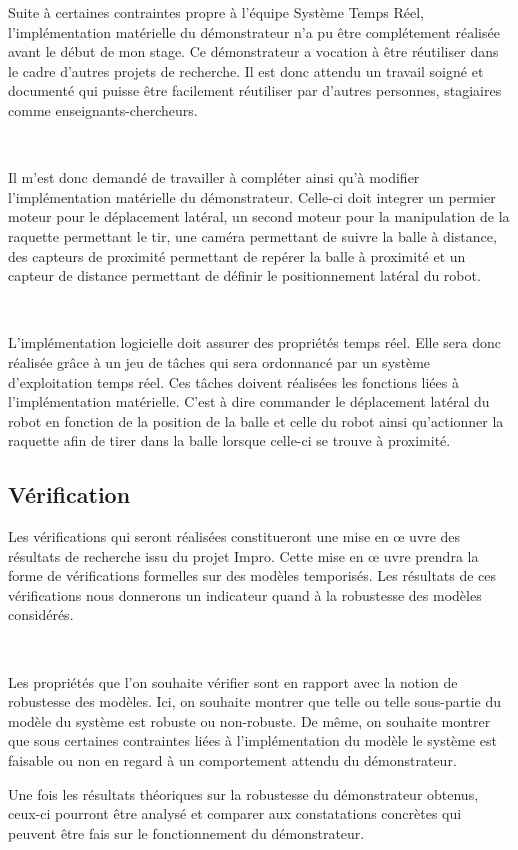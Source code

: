       Suite à certaines contraintes propre à l'équipe Système Temps Réel,
      l'implémentation matérielle du démonstrateur n'a pu être complétement
      réalisée avant le début de mon stage. Ce démonstrateur a vocation à être
      réutiliser dans le cadre d'autres projets de recherche. Il est donc
      attendu un travail soigné et documenté qui puisse être facilement
      réutiliser par d'autres personnes, stagiaires comme
      enseignants-chercheurs.

      ~

      Il m'est donc demandé de
      travailler à compléter ainsi qu'à modifier l'implémentation matérielle
      du démonstrateur. Celle-ci doit integrer un permier moteur pour le
      déplacement latéral, un second moteur pour la manipulation de la
      raquette permettant le tir, une caméra permettant de suivre la balle à
      distance, des capteurs de proximité permettant de repérer la balle à
      proximité et un capteur de distance permettant de définir le
      positionnement latéral du robot.

      ~
  
      L'implémentation logicielle doit assurer des propriétés temps réel. Elle
      sera donc réalisée grâce à un jeu de tâches qui sera ordonnancé par
      un système d'exploitation temps réel. Ces tâches doivent réalisées les
      fonctions liées à l'implémentation matérielle. C'est à dire commander le
      déplacement latéral du robot en fonction de la position de la balle et
      celle du robot ainsi qu'actionner la raquette afin de tirer dans la balle
      lorsque celle-ci se trouve à proximité.

    \subsection{Vérification}

      Les vérifications qui seront réalisées constitueront une mise en \oe
      uvre des résultats de recherche issu du projet Impro. Cette mise en \oe
      uvre prendra la forme de vérifications formelles sur des modèles
      temporisés. Les résultats de ces vérifications nous donnerons un
      indicateur quand à la robustesse des modèles considérés.

      ~
      
      Les propriétés que l'on souhaite vérifier sont en rapport avec la notion
      de robustesse des modèles. Ici, on souhaite montrer que telle ou telle
      sous-partie du modèle du système est robuste ou non-robuste. De même, on
      souhaite montrer que sous certaines contraintes liées à l'implémentation
      du modèle le système est faisable ou non en regard à un comportement
      attendu du démonstrateur. 

      Une fois les résultats théoriques sur la robustesse du démonstrateur
      obtenus, ceux-ci pourront être analysé et comparer aux constatations
      concrètes qui peuvent être fais sur le fonctionnement du démonstrateur.

